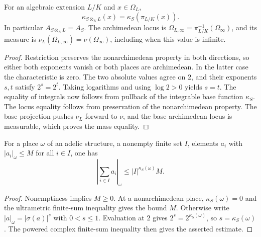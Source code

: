 \begin{lemma}
\label{lem:height-archimedean-extension}
\leanok
For an algebraic extension $L/K$ and $x\in\Omega_L$,
\[
 \kappa_{S\otimes_K L}(x)=\kappa_S(\pi_{L/K}(x)).
\]
In particular $A_{S\otimes_K L}=A_S$.
The archimedean locus is $\Omega_{L,\infty}=\pi_{L/K}^{-1}(\Omega_\infty)$,
and its measure is $\nu_L(\Omega_{L,\infty})=\nu(\Omega_\infty)$,
including when this value is infinite.
\end{lemma}
\begin{proof}
Restriction preserves the nonarchimedean property in both directions,
so either both exponents vanish or both places are archimedean. In
the latter case the characteristic is zero. The two absolute values
agree on $2$, and their exponents $s,t$ satisfy $2^s=2^t$. Taking
logarithms and using $\log2>0$ yields $s=t$. The equality of integrals
now follows from pullback of the integrable base function $\kappa_S$.
The locus equality follows from preservation of the nonarchimedean
property. The base projection pushes $\nu_L$ forward to $\nu$,
and the base archimedean locus is measurable, which proves the mass equality.
\end{proof}

\begin{lemma}
\label{lem:height-finite-sum-bound}
\leanok
For a place $\omega$ of an adelic structure, a nonempty finite set $I$,
elements $a_i$ with $|a_i|_\omega\leq M$ for all $i\in I$, one has
\[
 \left|\sum_{i\in I}a_i\right|_\omega\leq |I|^{\kappa_S(\omega)}M.
\]
\end{lemma}
\begin{proof}
Nonemptiness implies $M\geq0$. At a nonarchimedean place,
$\kappa_S(\omega)=0$ and the ultrametric finite-sum inequality gives
the bound $M$. Otherwise write $|a|_\omega=|\sigma(a)|^s$ with
$0<s\leq1$. Evaluation at $2$ gives $2^s=2^{\kappa_S(\omega)}$,
so $s=\kappa_S(\omega)$. The powered complex finite-sum inequality
then gives the asserted estimate.
\end{proof}

